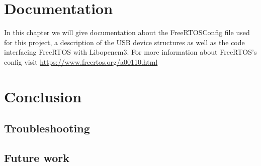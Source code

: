 \documentclass[12pt,a4paper]{report}
\begin{document}
\chapter{Documentation}
\label{chap:doc}
In this chapter we will give documentation about the FreeRTOSConfig file used for this project, a description of the USB device structures as well as the code interfacing FreeRTOS with Libopencm3. For more information about FreeRTOS's config visit \href{https://www.freertos.org/a00110.html}{https://www.freertos.org/a00110.html}
\chapter{Conclusion}
\label{chap:concl}
\section{Troubleshooting}
\label{sec:trouble}
\section{Future work}
\label{sec:future}
 

\end{document}
